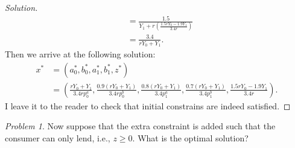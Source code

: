 \documentclass[12pt]{article}
\theoremstyle{definition}
\theoremstyle{remark}
\newtheorem{prob}{Problem}[section]
\begin{document}
\begin{proof}[Solution]
\begin{align*}
    &= \frac{1.5}{Y_1 + r \left( \frac{1.5rY_0 - 1.9Y_1}{3.4r} \right)} \\
    &= \frac{3.4}{rY_0 + Y_1}.
  \end{align*}
  Then we arrive at the following solution:
  \begin{align*}
    x^* &= (a_0^*, b_0^*, a_1^*, b_1^*, z^*)\\
    &= \left(\frac{rY_0 + Y_1}{3.4rp_0^a}, \frac{0.9(rY_0 + Y_1)}{3.4rp_0^b}, \frac{0.8(rY_0 + Y_1)}{3.4p_1^a}, \frac{0.7(rY_0 + Y_1)}{3.4p_1^b}, \frac{1.5rY_0 - 1.9Y_1}{3.4r}\right).
  \end{align*}
  I leave it to the reader to check that initial constrains are indeed satisfied.
\end{proof}
\begin{prob}
  Now suppose that the extra constraint is added such that the consumer can only lend, i.e., $z \geq 0$. What is the optimal solution?
\end{prob}
\end{document}
